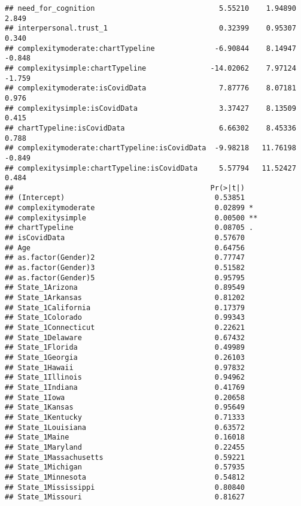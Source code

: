 \documentclass[
]{article}
\begin{document}
\begin{verbatim}
## need_for_cognition                             5.55210    1.94890   2.849
## interpersonal.trust_1                          0.32399    0.95307   0.340
## complexitymoderate:chartTypeline              -6.90844    8.14947  -0.848
## complexitysimple:chartTypeline               -14.02062    7.97124  -1.759
## complexitymoderate:isCovidData                 7.87776    8.07181   0.976
## complexitysimple:isCovidData                   3.37427    8.13509   0.415
## chartTypeline:isCovidData                      6.66302    8.45336   0.788
## complexitymoderate:chartTypeline:isCovidData  -9.98218   11.76198  -0.849
## complexitysimple:chartTypeline:isCovidData     5.57794   11.52427   0.484
##                                              Pr(>|t|)   
## (Intercept)                                   0.53851   
## complexitymoderate                            0.02899 * 
## complexitysimple                              0.00500 **
## chartTypeline                                 0.08705 . 
## isCovidData                                   0.57670   
## Age                                           0.64756   
## as.factor(Gender)2                            0.77747   
## as.factor(Gender)3                            0.51582   
## as.factor(Gender)5                            0.95795   
## State_1Arizona                                0.89549   
## State_1Arkansas                               0.81202   
## State_1California                             0.17379   
## State_1Colorado                               0.99343   
## State_1Connecticut                            0.22621   
## State_1Delaware                               0.67432   
## State_1Florida                                0.49989   
## State_1Georgia                                0.26103   
## State_1Hawaii                                 0.97832   
## State_1Illinois                               0.94962   
## State_1Indiana                                0.41769   
## State_1Iowa                                   0.20658   
## State_1Kansas                                 0.95649   
## State_1Kentucky                               0.71333   
## State_1Louisiana                              0.63572   
## State_1Maine                                  0.16018   
## State_1Maryland                               0.22455   
## State_1Massachusetts                          0.59221   
## State_1Michigan                               0.57935   
## State_1Minnesota                              0.54812   
## State_1Mississippi                            0.80840   
## State_1Missouri                               0.81627   

\end{verbatim}
\end{document}
